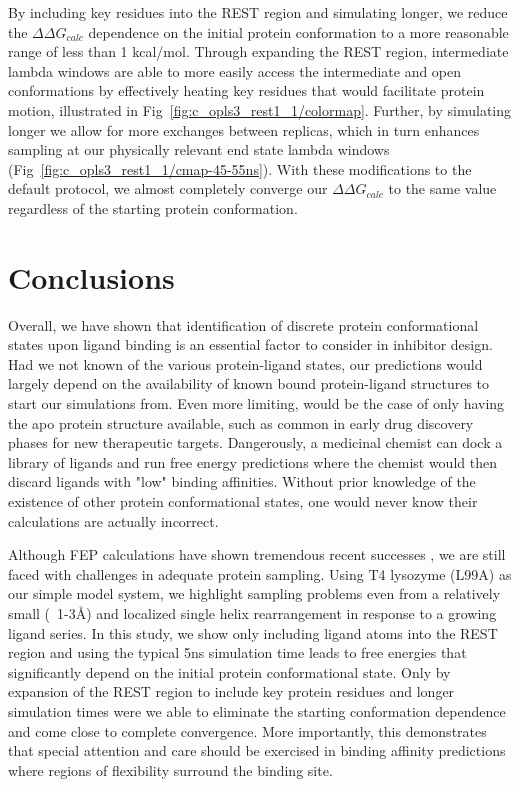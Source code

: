\documentclass[journal=jctcce,manuscript=article]{achemso}
\begin{document}
By including key residues into the REST region and simulating longer, we reduce the $\Delta\Delta G_{calc}$ dependence on the initial protein conformation to a more reasonable range of less than 1 kcal/mol.
Through expanding the REST region, intermediate lambda windows are able to more easily access the intermediate and open conformations by effectively heating key residues that would facilitate protein motion, illustrated in Fig~\ref{fig:c_opls3_rest1_1/colormap}.
Further, by simulating longer we allow for more exchanges between replicas, which in turn enhances sampling at our physically relevant end state lambda windows (Fig~\ref{fig:c_opls3_rest1_1/cmap-45-55ns}).   
With these modifications to the default protocol, we almost completely converge our $\Delta\Delta G_{calc}$ to the same value regardless of the starting protein conformation.

\section{Conclusions}
Overall, we have shown that identification of discrete protein conformational states upon ligand binding is an essential factor to consider in inhibitor design.
Had we not known of the various protein-ligand states, our predictions would largely depend on the availability of known bound protein-ligand structures to start our simulations from.
Even more limiting, would be the case of only having the apo protein structure available, such as common in early drug discovery phases for new therapeutic targets.
Dangerously, a medicinal chemist can dock a library of ligands and run free energy predictions where the chemist would then discard ligands with "low" binding affinities.
Without prior knowledge of the existence of other protein conformational states, one would never know their calculations are actually incorrect. 

Although FEP calculations have shown tremendous recent successes \cite{FEPplus}, we are still faced with challenges in adequate protein sampling.
Using T4 lysozyme (L99A) as our simple model system, we highlight sampling problems even from a relatively small (~1-3\AA) and localized single helix rearrangement in response to a growing ligand series.
In this study, we show only including ligand atoms into the REST region and using the typical 5ns simulation time leads to free energies that significantly depend on the initial protein conformational state. 
Only by expansion of the REST region to include key protein residues and longer simulation times were we able to eliminate the starting conformation dependence and come close to complete convergence.
More importantly, this demonstrates that special attention and care should be exercised in binding affinity predictions where regions of flexibility surround the binding site.
\end{document}
